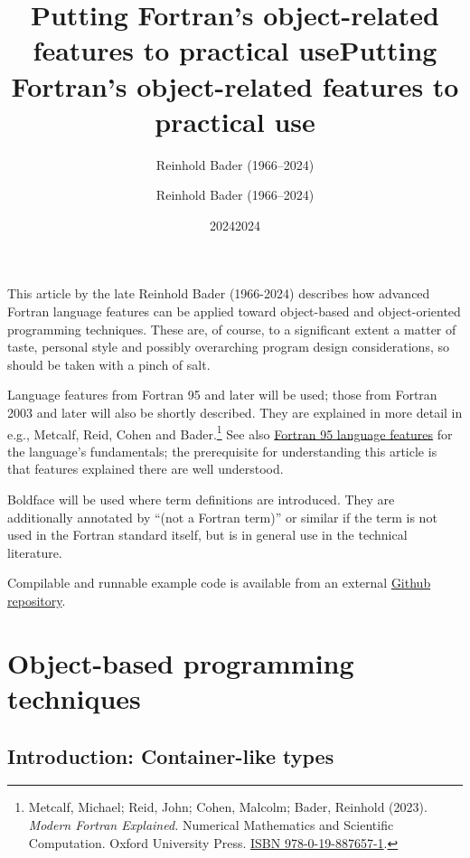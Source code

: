 \documentclass[
  paper=a4,
  ,captions=tableheading
]{scrartcl}
\title{Putting Fortran's object-related features to practical use}
\author{Reinhold Bader (1966--2024)}
\date{2024}
\title{Putting Fortran's object-related features to practical use}
\author{Reinhold Bader (1966--2024)}
\date{2024}
\begin{document}




{
\hypersetup{linkcolor=}
\setcounter{tocdepth}{3}
\tableofcontents
}
This article by the late Reinhold Bader (1966-2024) describes how
advanced Fortran language features can be applied toward object-based
and object-oriented programming techniques. These are, of course, to a
significant extent a matter of taste, personal style and possibly
overarching program design considerations, so should be taken with a
pinch of salt.

Language features from Fortran 95 and later will be used; those from
Fortran 2003 and later will also be shortly described. They are
explained in more detail in e.g., Metcalf, Reid, Cohen and
Bader.\footnote{Metcalf, Michael; Reid, John; Cohen, Malcolm; Bader,
  Reinhold (2023). \emph{Modern Fortran Explained.} Numerical
  Mathematics and Scientific Computation. Oxford University Press.
  \href{https://en.wikipedia.org/wiki/Special:BookSources/978-0-19-887657-1}{ISBN
  978-0-19-887657-1}.} See also
\href{https://en.wikipedia.org/wiki/Fortran_95_language_features}{Fortran
95 language features} for the language's fundamentals; the prerequisite
for understanding this article is that features explained there are well
understood.

Boldface will be used where term definitions are introduced. They are
additionally annotated by ``(not a Fortran term)'' or similar if the
term is not used in the Fortran standard itself, but is in general use
in the technical literature.

Compilable and runnable example code is available from an external
\href{https://github.com/reinh-bader/object_fortran}{Github repository}.

\section{Object-based programming techniques}\label{sec:oop_techniques}

\subsection{Introduction: Container-like
types}\label{introduction-container-like-types}
\end{document}
